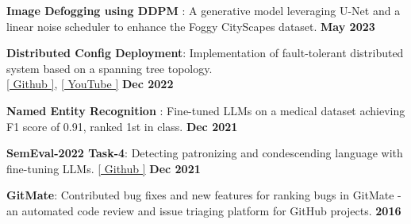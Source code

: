 \begin{zitemize}
\item \textbf{Image Defogging using DDPM} : A generative model leveraging U-Net and a linear noise scheduler to enhance the Foggy CityScapes dataset.  \hfill \textbf{May 2023}
\item \textbf{Distributed Config Deployment}: Implementation of fault-tolerant distributed system based on a spanning tree topology. \\ \href{https://github.com/tushar-rishav/CSCI5273_Final_Project}{[ Github ]}, \href{https://www.youtube.com/watch?v=tZjVTBsGzvQ}{[ YouTube ]}  \hfill \textbf{Dec 2022}
\item \textbf{Named Entity Recognition} : Fine-tuned LLMs on a medical dataset achieving F1 score of 0.91, ranked 1st in class.  \hfill \textbf{Dec 2021}
\item \textbf{SemEval-2022 Task-4}: Detecting patronizing and condescending language with fine-tuning LLMs. \href{https://github.com/tushar-rishav/SemEval-2022}{[ Github ]} \hfill \textbf{Dec 2021}
\item  \textbf{GitMate}: Contributed bug fixes and new features for ranking bugs in GitMate - an automated code review and issue triaging platform for GitHub projects.  \hfill \textbf{2016}
\vspace{1mm}
\end{zitemize}


